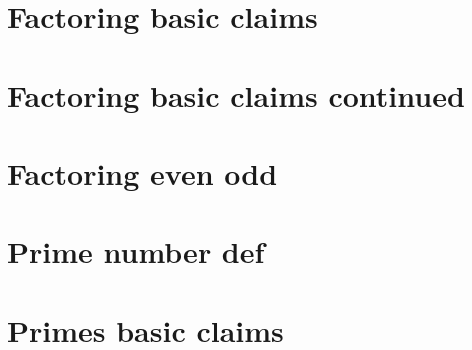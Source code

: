 \section*{Factoring basic claims}

\vfill
\section*{Factoring basic claims continued}

\vfill
\section*{Factoring even odd}

\vfill
\section*{Prime number def}

\vfill
\section*{Primes basic claims}

\vfill
